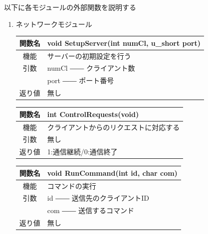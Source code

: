 \documentclass{jarticle}
\begin{document}
以下に各モジュールの外部関数を説明する
\begin{enumerate}
    \item ネットワークモジュール
    \begin{table}[H]
        \label{table:fanc_s1-1}
        \begin{center}
            \begin{tabular}{|c||p{30em}|}\hline
                関数名&void SetupServer(int numCl, u\_short port)\\\hline
                機能&サーバーの初期設定を行う\\
                引数&numCl ―― クライアント数\\
                &port ―― ポート番号\\
                返り値&無し\\\hline
            \end{tabular}
        \end{center}
    \end{table}
    \begin{table}[H]
        \label{table:fanc_s1-2}
        \begin{center}
            \begin{tabular}{|c||p{30em}|}\hline
                関数名&int ControlRequests(void) \\\hline
                機能&クライアントからのリクエストに対応する\\
                引数&無し\\
                返り値&1:通信継続/0:通信終了\\\hline
            \end{tabular}
        \end{center}
    \end{table}
    \begin{table}[H]
        \label{table:fanc_s1-3}
        \begin{center}
            \begin{tabular}{|c||p{30em}|}\hline
                関数名&void RunCommand(int id, char com) \\\hline
                機能&コマンドの実行\\
                引数&id ―― 送信先のクライアントID\\
                &com ―― 送信するコマンド\\
                返り値&無し\\\hline
            \end{tabular}
        \end{center}

\end{table}
\end{enumerate}
\end{document}
